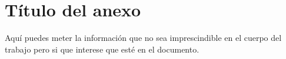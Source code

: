 \section{Título del anexo} \label{ap:montaje}

Aquí puedes meter la información que no sea imprescindible en el cuerpo del trabajo pero si que interese que esté en el documento.